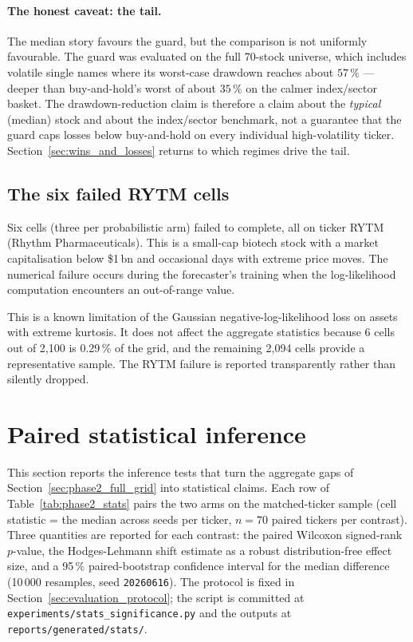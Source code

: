 \paragraph{The honest caveat: the tail.} The median story favours the guard, but the comparison is not uniformly favourable. The guard was evaluated on the full 70-stock universe, which includes volatile single names where its worst-case drawdown reaches about $57\,\%$ --- deeper than buy-and-hold's worst of about $35\,\%$ on the calmer index/sector basket. The drawdown-reduction claim is therefore a claim about the \emph{typical} (median) stock and about the index/sector benchmark, not a guarantee that the guard caps losses below buy-and-hold on every individual high-volatility ticker. Section~\ref{sec:wins_and_losses} returns to which regimes drive the tail.

\subsection{The six failed RYTM cells}

Six cells (three per probabilistic arm) failed to complete, all on ticker RYTM (Rhythm Pharmaceuticals). This is a small-cap biotech stock with a market capitalisation below \$1\,bn and occasional days with extreme price moves. The numerical failure occurs during the forecaster's training when the log-likelihood computation encounters an out-of-range value.

This is a known limitation of the Gaussian negative-log-likelihood loss on assets with extreme kurtosis. It does not affect the aggregate statistics because 6 cells out of 2,100 is 0.29\,\% of the grid, and the remaining 2,094 cells provide a representative sample. The RYTM failure is reported transparently rather than silently dropped.

\section{Paired statistical inference}
\label{sec:phase2_inference}

This section reports the inference tests that turn the aggregate gaps of Section~\ref{sec:phase2_full_grid} into statistical claims. Each row of Table~\ref{tab:phase2_stats} pairs the two arms on the matched-ticker sample (cell statistic = the median across seeds per ticker, $n = 70$ paired tickers per contrast). Three quantities are reported for each contrast: the paired Wilcoxon signed-rank $p$-value, the Hodges-Lehmann shift estimate as a robust distribution-free effect size, and a 95\,\% paired-bootstrap confidence interval for the median difference (10\,000 resamples, seed \texttt{20260616}). The protocol is fixed in Section~\ref{sec:evaluation_protocol}; the script is committed at \texttt{experiments/stats\_significance.py} and the outputs at \texttt{reports/generated/stats/}.

